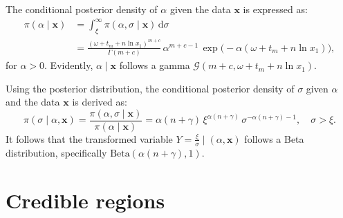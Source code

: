 \documentclass[twoside]{article}
\begin{document}
\begin{cor}\label{alpha-marginal-corollary}
	The conditional posterior density of $\alpha$ given the data $\mathbf{x}$ is expressed as:
	\begin{align*}
		\pi(\alpha \mid \mathbf{x}) &= \int_\xi^\infty \pi(\alpha, \sigma \mid \mathbf{x}) \, \mathrm{d}\sigma\\
		&	= \frac{(\omega+t_m+n\ln x_1)^{m + c}}{\Gamma(m + c)}\, \alpha^{m + c-1}\,\exp\big(-\alpha(\omega+t_m+n\ln x_1)\big), 	
	\end{align*}
	for $\alpha > 0$. Evidently, $\alpha \mid \mathbf{x}$ follows a gamma  $\mathcal{G}(m + c, \omega+ t_m+n\ln x_1)$.
\end{cor}
%
\begin{cor}\label{conditional-sigma-corollary}
	Using the posterior distribution, the conditional posterior density of $\sigma$ given $\alpha$ and the data $\mathbf{x}$ is derived as:	
	\[
	\pi(\sigma \mid \alpha, \mathbf{x}) = \frac{\pi(\alpha, \sigma \mid \mathbf{x})}{\pi(\alpha \mid \mathbf{x})} = \alpha (n + \gamma)\,\xi^{\alpha (n + \gamma)}\, \sigma^{-\alpha (n + \gamma) - 1}, \quad  \sigma > \xi.
	\]	
	It follows that the transformed variable $Y = \frac{\xi}{\sigma} \mid (\alpha, \mathbf{x})$ follows a Beta distribution, specifically $\text{Beta}(\alpha (n + \gamma), 1)$.
\end{cor}





\section{Credible regions} \label{closed-form-region}
\end{document}
